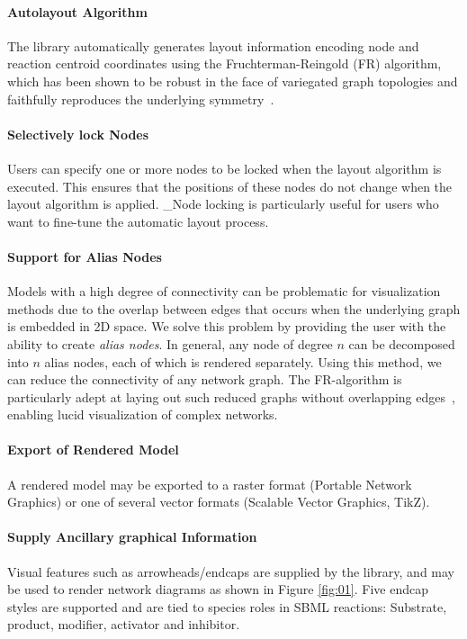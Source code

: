 \documentclass{bioinfo}
\begin{document}
\paragraph{Autolayout Algorithm}
The library automatically generates layout information encoding node and reaction centroid coordinates using the Fruch\-terman-Reingold (FR) algorithm, which has been shown to be robust in the face of variegated graph topologies and faithfully reproduces the underlying symm\-etry~\citep{FruchtermanReingold}. 

\paragraph{Selectively lock Nodes} Users can specify one or more nodes to be locked when the layout algorithm is executed. This ensures that the positions of these nodes do not change when the layout algorithm is applied.
_Node locking is particularly useful for users who want to fine-tune the automatic layout process.

\paragraph{Support for Alias Nodes}
Models with a high degree of connectivity can be problematic for visualization
methods due to the overlap between edges that occurs when the underlying 
graph is embedded in 2D space.
We solve this problem by providing the user
with the ability to create \textit{alias nodes}. In general, any node of degree
$n$ can be decomposed into $n$ alias nodes, each of which is rendered separately.
Using this method, we can reduce the connectivity of any network graph.
The FR-algorithm is particularly adept at laying out such reduced graphs without overlapping edges~\citep{FruchtermanReingold}, 
enabling lucid visualization of complex networks.

\paragraph{Export of Rendered Model}
A rendered model may be exported to a raster format (Portable Network Graphics) or one of several vector formats (Scalable Vector Graphics, TikZ). 

\paragraph{Supply Ancillary graphical Information}
Visual features such as arrowheads/endcaps are supplied by the library, and may be used to render network diagrams as shown in Figure \ref{fig:01}. Five endcap styles are supported and are tied to species roles in SBML reactions: Substrate, product, modifier, activator and inhibitor. 
\end{document}
